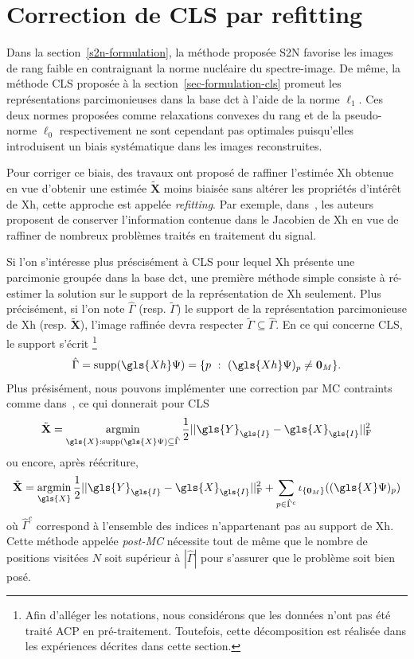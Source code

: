 \section{Correction de CLS par refitting}

Dans la section~\ref{s2n-formulation}, la méthode proposée S2N favorise les images de rang faible en contraignant la norme nucléaire du spectre-image. De même, la méthode CLS proposée à la section~\ref{sec-formulation-cls} promeut les représentations parcimonieuses dans la base \gls{dct} à l'aide de la norme $\ell_{1}$. Ces deux normes proposées comme relaxations convexes du rang et de la pseudo-norme $\ell_0$ respectivement ne sont cependant pas optimales puisqu'elles introduisent un biais systématique dans les images reconstruites.

Pour corriger ce biais, des travaux ont proposé de raffiner l'estimée \gls{Xh} obtenue en vue d'obtenir une estimée $\tilde{\mathbf{X}}$ moins biaisée sans altérer les propriétés d'intérêt de \gls{Xh}, cette approche est appelée \emph{refitting}. %
%
Par exemple, dans~\cite{deledalle2017clear}, les auteurs proposent de conserver l'information contenue dans le Jacobien de \gls{Xh} en vue de raffiner de nombreux problèmes traités en traitement du signal.


Si l'on s'intéresse plus préscisément à CLS pour lequel \gls{Xh} présente une parcimonie groupée dans la base \gls{dct}, une première méthode simple consiste à ré-estimer la solution sur le support de la représentation de \gls{Xh} seulement.
Plus précisément, si l'on note $\hat{\Gamma}$ (resp. $\tilde{\Gamma}$) le support de la représentation parcimonieuse de \gls{Xh} (resp. $\tilde{\mathbf{X}}$), l'image raffinée devra respecter $\tilde{\Gamma} \subseteq \hat{\Gamma}$. En ce qui concerne CLS, le support s'écrit%
%
\footnote{Afin d'alléger les notations, nous considérons que les données n'ont pas été traité ACP en pré-traitement. Toutefois, cette décomposition est réalisée dans les expériences décrites dans cette section.}
%
\begin{equation}
    \hat{\Gamma} = \mathrm{supp}(\gls{Xh}\Psi)  = \{p\ :\ (\gls{Xh}\Psi)_p \neq \mathbf{0}_M \}.
\end{equation}
Plus présisément, nous pouvons implémenter une correction par MC contraints comme dans~\cite{belloni2013least}, ce qui donnerait pour CLS
\begin{equation}
    \tilde{\mathbf{X}} = \argmin_{\gls{X} : \mathrm{supp}(\gls{X}\Psi)\subseteq\hat{\Gamma}} 
    \frac{1}{2}\frobnorm{\gls{Y}_{\gls{I}} - \gls{X}_{\gls{I}}}
\end{equation}
ou encore, après réécriture,
\begin{equation}\label{eq-refining-simple}
    \tilde{\mathbf{X}} = \argmin_{\gls{X}} 
    \frac{1}{2}\frobnorm{\gls{Y}_{\gls{I}} - \gls{X}_{\gls{I}}} + 
    \sum_{p\in\hat{\Gamma}^c} \iota_{\{\mathbf{0}_M\}}((\gls{X}\Psi)_p)
\end{equation}
où $\hat{\Gamma}^c$ correspond à l'ensemble des indices n'appartenant pas au support de \gls{Xh}. Cette méthode appelée \emph{post-MC} nécessite tout de même que le nombre de positions visitées $N$ soit supérieur à $|\hat{\Gamma}|$ pour s'assurer que le problème soit bien posé.

